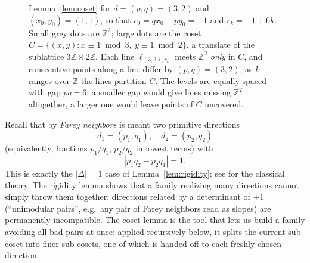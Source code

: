 \documentclass[a4paper,11pt,oneside,reqno]{amsart}
\theoremstyle{definition}
\theoremstyle{remark}
\theoremstyle{plain}
\newcommand{\Z}{\mathbb{Z}}
\begin{document}
\begin{figure}[htbp]
  \centering
  \caption{Lemma~\ref{lem:coset} for \(d=(p,q)=(3,2)\) and \((x_0,y_0)=(1,1)\), so that
    \(c_0=qx_0-py_0=-1\) and \(r_k=-1+6k\). Small grey dots are \(\Z^2\); large dots are the coset
    \(C=\{(x,y): x\equiv 1 \bmod 3,\ y\equiv 1 \bmod 2\}\), a translate of the sublattice
    \(3\Z\times2\Z\). Each line \(\ell_{(3,2),r_k}\) meets \(\Z^2\) \emph{only} in \(C\), and
    consecutive points along a line differ by \((p,q)=(3,2)\); as \(k\) ranges over \(\Z\) the
    lines partition \(C\). The levels are equally spaced with gap \(pq=6\): a smaller gap would
    give lines missing \(\Z^2\) altogether, a larger one would leave points of \(C\) uncovered.}
  \label{fig:coset}
\end{figure}

Recall that by \emph{Farey neighbors} is meant two primitive directions
\[d_1=(p_1,q_1), \quad d_2=(p_2,q_2)\]
(equivalently, fractions \(p_1/q_1\), \(p_2/q_2\) in lowest
terms) with
\[|p_1q_2-p_2q_1|=1.\]
This is exactly the \(|\Delta|=1\) case of
Lemma~\ref{lem:rigidity}; see \cite[Ch.~III]{HardyWright2008} for the classical theory.
The rigidity lemma shows that a family realizing many directions cannot simply throw them
together: directions related by a determinant of \(\pm1\) (``unimodular pairs'', e.g.\ any pair of
Farey neighbors read as slopes) are permanently incompatible. The coset lemma is the tool that lets
us build a family avoiding all bad pairs at once: applied recursively below, it splits the current
sub-coset into finer sub-cosets, one of which is handed off to each freshly chosen direction.
\end{document}
